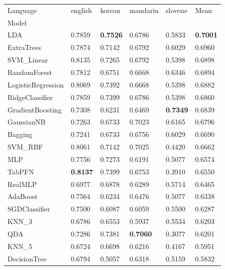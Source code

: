 \begin{tabular}{llllll}
\toprule
Language & english & korean & mandarin & slovene & Mean \\
Model &  &  &  &  &  \\
\midrule
LDA & 0.7859 & \textbf{0.7526} & 0.6786 & 0.5833 & \textbf{0.7001} \\
ExtraTrees & 0.7874 & 0.7142 & 0.6792 & 0.6029 & 0.6960 \\
SVM_Linear & 0.8135 & 0.7265 & 0.6792 & 0.5398 & 0.6898 \\
RandomForest & 0.7812 & 0.6751 & 0.6668 & 0.6346 & 0.6894 \\
LogisticRegression & 0.8069 & 0.7392 & 0.6668 & 0.5398 & 0.6882 \\
RidgeClassifier & 0.7859 & 0.7399 & 0.6786 & 0.5398 & 0.6860 \\
GradientBoosting & 0.7308 & 0.6231 & 0.6469 & \textbf{0.7349} & 0.6839 \\
GaussianNB & 0.7263 & 0.6733 & 0.7023 & 0.6165 & 0.6796 \\
Bagging & 0.7241 & 0.6733 & 0.6756 & 0.6029 & 0.6690 \\
SVM_RBF & 0.8061 & 0.7142 & 0.7025 & 0.4420 & 0.6662 \\
MLP & 0.7756 & 0.7273 & 0.6191 & 0.5077 & 0.6574 \\
TabPFN & \textbf{0.8137} & 0.7399 & 0.6753 & 0.3910 & 0.6550 \\
RealMLP & 0.6977 & 0.6878 & 0.6289 & 0.5714 & 0.6465 \\
AdaBoost & 0.7564 & 0.6234 & 0.6476 & 0.5077 & 0.6338 \\
SGDClassifier & 0.7500 & 0.6087 & 0.6059 & 0.5500 & 0.6287 \\
KNN_3 & 0.6786 & 0.6553 & 0.5937 & 0.5534 & 0.6203 \\
QDA & 0.7286 & 0.7381 & \textbf{0.7060} & 0.3077 & 0.6201 \\
KNN_5 & 0.6724 & 0.6698 & 0.6216 & 0.4167 & 0.5951 \\
DecisionTree & 0.6794 & 0.5057 & 0.6318 & 0.5159 & 0.5832 \\
\bottomrule
\end{tabular}
